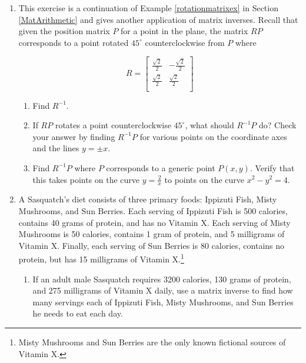 \begin{enumerate}
\setcounter{enumi}{\value{HW}}

\item  This exercise is a continuation of Example \ref{rotationmatrixex} in Section \ref{MatArithmetic} and gives another application of matrix inverses.  Recall that given the position matrix $P$ for a point in the plane, the matrix $RP$ corresponds to a point rotated $45^{\circ}$ counterclockwise from $P$ where
 
\[R = \left[ \begin{array}{rr} \frac{\sqrt{2}}{2} & -\frac{\sqrt{2}}{2} \\[3pt] \frac{\sqrt{2}}{2} & \frac{\sqrt{2}}{2} \\ \end{array} \right]\]
 
\begin{enumerate}

\item  Find $R^{-1}$.
\item  If $RP$ rotates a point counterclockwise $45^{\circ}$, what should $R^{-1}P$ do?  Check your answer by finding $R^{-1}P$ for various points on the coordinate axes and the lines $y=\pm x$.
\item  Find $R^{-1}P$ where $P$ corresponds to a generic point $P(x,y)$. Verify that this takes points on the curve $y=\frac{2}{x}$ to points on the curve $x^2-y^2=4$.

\end{enumerate}

\item \label{SasquatchDiet} A Sasquatch's diet consists of three primary foods:  Ippizuti Fish, Misty Mushrooms, and Sun Berries.  Each serving of Ippizuti Fish is 500 calories, contains 40 grams of protein, and has no Vitamin X.  Each serving of Misty Mushrooms is 50 calories, contains 1 gram of protein, and 5 milligrams of Vitamin X.  Finally, each serving of Sun Berries is 80 calories, contains no protein, but has 15 milligrams of Vitamin X.\footnote{Misty Mushrooms and Sun Berries are the only known fictional sources of Vitamin X.}

\begin{enumerate}

\item  If an adult male Sasquatch requires 3200 calories, 130 grams of protein, and 275 milligrams of Vitamin X daily, use a matrix inverse to find how many servings each of Ippizuti Fish, Misty Mushrooms, and Sun Berries he needs to eat each day.


\end{enumerate}
\end{enumerate}
